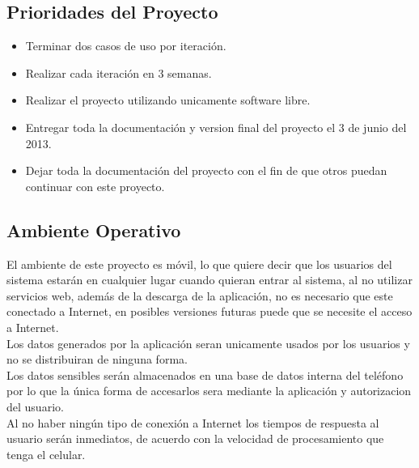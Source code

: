 \documentclass[12pt]{article}
\begin{document}
\subsection{Prioridades del Proyecto}

\begin{itemize}
	\item{Terminar dos casos de uso por iteraci\'on.}
	\item{Realizar cada iteraci\'on en 3 semanas.}
	\item{Realizar el proyecto utilizando unicamente software libre.}
	\item{Entregar toda la documentaci\'on y version final del proyecto el 3 de junio del 2013.}
	\item{Dejar toda la documentaci\'on del proyecto con el fin de que otros puedan continuar con este proyecto.}
\end{itemize}

\newpage
\subsection{Ambiente Operativo}

El ambiente de este proyecto es m\'ovil, lo que quiere decir que los usuarios del sistema estar\'an en cualquier lugar cuando quieran entrar al sistema, al no utilizar servicios web, adem\'as de la descarga de la aplicaci\'on, no es necesario que este conectado a Internet, en posibles versiones futuras puede que se necesite el acceso a Internet.\\ 
Los datos generados por la aplicaci\'on seran unicamente usados por los usuarios y no se distribuiran de ninguna forma.\\
Los datos sensibles ser\'an almacenados en una base de datos interna del tel\'efono por lo que la \'unica forma de accesarlos sera mediante la aplicaci\'on y autorizacion del usuario.\\
Al no haber ning\'un tipo de conexi\'on a Internet los tiempos de respuesta al usuario ser\'an inmediatos, de acuerdo con la velocidad de procesamiento que tenga el celular.
\end{document}
